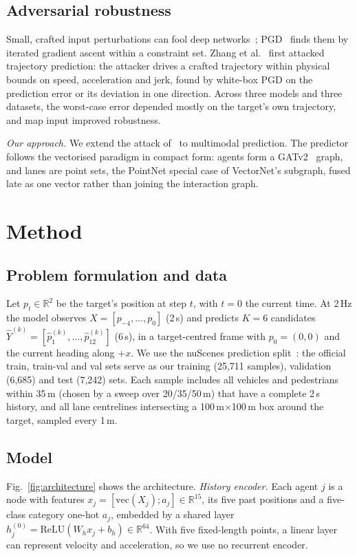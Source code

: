 \documentclass[conference]{IEEEtran}
\begin{document}
\subsection{Adversarial robustness}
Small, crafted input perturbations can fool deep networks~\cite{goodfellow2015explaining}; PGD~\cite{madry2018pgd} finds them by iterated gradient ascent within a constraint set. Zhang et al.~\cite{zhang2022adversarial} first attacked trajectory prediction: the attacker drives a crafted trajectory within physical bounds on speed, acceleration and jerk, found by white-box PGD on the prediction error or its deviation in one direction. Across three models and three datasets, the worst-case error depended mostly on the target's own trajectory, and map input improved robustness.

\textit{Our approach.} We extend the attack of~\cite{zhang2022adversarial} to multimodal prediction. The predictor follows the vectorised paradigm in compact form: agents form a GATv2~\cite{brody2022gatv2} graph, and lanes are point sets, the PointNet special case of VectorNet's subgraph, fused late as one vector rather than joining the interaction graph.

\section{Method}
\subsection{Problem formulation and data}
Let $p_t\in\mathbb{R}^2$ be the target's position at step $t$, with $t=0$ the current time. At 2\,Hz the model observes $X=[p_{-4},\ldots,p_0]$ (2\,s) and predicts $K=6$ candidates $\hat{Y}^{(k)}=[\hat p^{(k)}_1,\ldots,\hat p^{(k)}_{12}]$ (6\,s), in a target-centred frame with $p_0=(0,0)$ and the current heading along $+x$. We use the nuScenes prediction split~\cite{caesar2020nuscenes}: the official train, train-val and val sets serve as our training (25{,}711 samples), validation (6{,}685) and test (7{,}242) sets. Each sample includes all vehicles and pedestrians within 35\,m (chosen by a sweep over 20/35/50\,m) that have a complete 2\,s history, and all lane centrelines intersecting a 100\,m$\times$100\,m box around the target, sampled every 1\,m.

\subsection{Model}
Fig.~\ref{fig:architecture} shows the architecture. \textit{History encoder.} Each agent $j$ is a node with features $x_j=[\mathrm{vec}(X_j);a_j]\in\mathbb{R}^{15}$, its five past positions and a five-class category one-hot $a_j$, embedded by a shared layer $h^{(0)}_j=\mathrm{ReLU}(W_h x_j+b_h)\in\mathbb{R}^{64}$. With five fixed-length points, a linear layer can represent velocity and acceleration, so we use no recurrent encoder.
\end{document}
